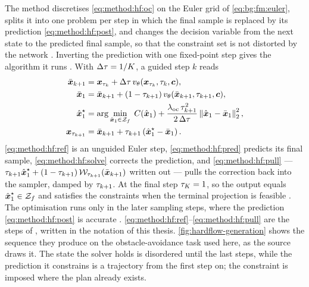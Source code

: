 The method discretises \eqref{eq:method:hf:oc} on the Euler grid of \eqref{eq:bg:fm:euler}, splits it into
one problem per step in which the final sample is replaced by its prediction
\eqref{eq:method:hf:post}, and changes the decision variable from the next state to the predicted final
sample, so that the constraint set is not distorted by the network \parencite[Problems~2--5]{li2025hardflow}.
Inverting the prediction with one fixed-point step gives the algorithm it runs
\parencite[Algorithm~1]{li2025hardflow}. With $\Delta\tau = 1/K$, a guided step $k$ reads
\begin{align}
  \bar{\boldsymbol{x}}_{k+1} &= \boldsymbol{x}_{\tau_{k}}
    + \Delta\tau\,v_{\theta}(\boldsymbol{x}_{\tau_{k}},\tau_{k},\boldsymbol{c}),
    \label{eq:method:hf:ref}\\
  \bar{\boldsymbol{x}}_{1} &= \bar{\boldsymbol{x}}_{k+1}
    + (1-\tau_{k+1})\,v_{\theta}(\bar{\boldsymbol{x}}_{k+1},\tau_{k+1},\boldsymbol{c}),
    \label{eq:method:hf:pred}\\
  \hat{\boldsymbol{x}}_{1}^{\star} &= \arg\min_{\hat{\boldsymbol{x}}_{1}\in\mathcal{Z}_{f}}\;
    C(\hat{\boldsymbol{x}}_{1})
    + \frac{\lambda_{\textrm{oc}}\,\tau_{k+1}^{2}}{2\,\Delta\tau}\left\|\hat{\boldsymbol{x}}_{1}-\bar{\boldsymbol{x}}_{1}\right\|_{2}^{2},
    \label{eq:method:hf:solve}\\
  \boldsymbol{x}_{\tau_{k+1}} &= \bar{\boldsymbol{x}}_{k+1} + \tau_{k+1}\left(\hat{\boldsymbol{x}}_{1}^{\star}-\bar{\boldsymbol{x}}_{1}\right).
    \label{eq:method:hf:pull}
\end{align}
\eqref{eq:method:hf:ref} is an unguided Euler step, \eqref{eq:method:hf:pred} predicts its final sample,
\eqref{eq:method:hf:solve} corrects the prediction, and \eqref{eq:method:hf:pull} ---
$\tau_{k+1}\hat{\boldsymbol{x}}_{1}^{\star} + (1-\tau_{k+1})\,\mathcal{W}_{\tau_{k+1}}(\bar{\boldsymbol{x}}_{k+1})$
written out --- pulls the correction back into the sampler, damped by $\tau_{k+1}$. At the final step
$\tau_{K} = 1$, so the output equals $\hat{\boldsymbol{x}}_{1}^{\star}\in\mathcal{Z}_{f}$ and satisfies the
constraints when the terminal projection is feasible \parencite[Prop.~1]{li2025hardflow}. The optimisation runs only in the later sampling
steps, where the prediction \eqref{eq:method:hf:post} is accurate \parencite{li2025hardflow}.
\eqref{eq:method:hf:ref}--\eqref{eq:method:hf:pull} are the steps of
\parencite[Alg.~1]{li2025hardflow}, written in the notation of this thesis.
\autoref{fig:hardflow-generation} shows the sequence they produce on the obstacle-avoidance task
used here, as the source draws it. The state the solver holds is disordered until the last steps,
while the prediction it constrains is a trajectory from the first step on; the constraint is
imposed where the plan already exists.

